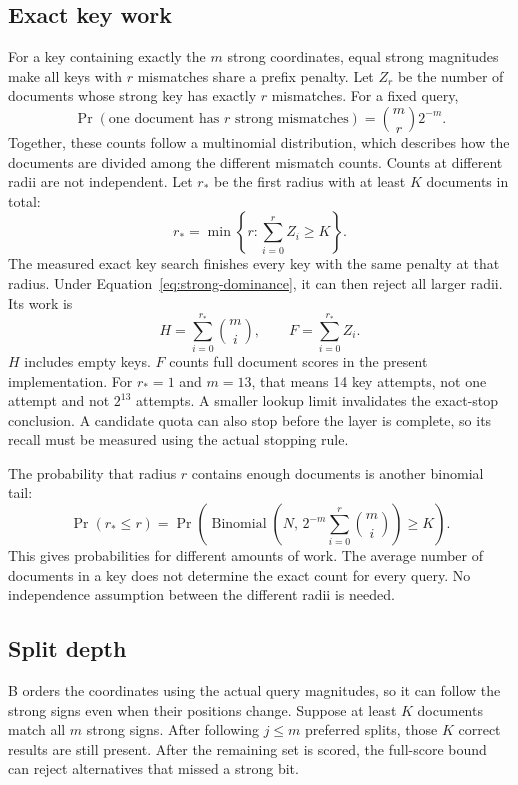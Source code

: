 \subsection{Exact key work}
For a key containing exactly the $m$ strong coordinates, equal strong magnitudes make all keys
with $r$ mismatches share a prefix penalty. Let $Z_r$ be the number of documents whose strong
key has exactly $r$ mismatches. For a fixed query,
\[
\Pr(\text{one document has }r\text{ strong mismatches})=\binom mr2^{-m}.
\]
Together, these counts follow a multinomial distribution, which describes how the documents
are divided among the different mismatch counts. Counts at different radii are not independent. Let $r_*$ be the first radius with at least $K$ documents in total:
\[
r_* = \min\left\{r:\sum_{i=0}^{r}Z_i\ge K\right\}.
\]
The measured exact key search finishes every key with the same penalty at that radius. Under
Equation~\eqref{eq:strong-dominance}, it can then reject all larger radii. Its work is
\begin{equation}
H=\sum_{i=0}^{r_*}\binom mi,\qquad F=\sum_{i=0}^{r_*}Z_i.
\label{eq:strong-key-work}
\end{equation}
$H$ includes empty keys. $F$ counts full document scores in the present implementation.
For $r_*=1$ and $m=13$, that means 14 key attempts, not one attempt and not $2^{13}$ attempts.
A smaller lookup limit invalidates the exact-stop conclusion. A candidate quota can also stop
before the layer is complete, so its recall must be measured using the actual stopping rule.

The probability that radius $r$ contains enough documents is another binomial tail:
\[
\Pr(r_*\le r)=\Pr\!\left(\operatorname{Binomial}\!\left(N,\,2^{-m}\sum_{i=0}^{r}\binom mi\right)\ge K\right).
\]
This gives probabilities for different amounts of work. The average number of documents
in a key does not determine the exact count for every query. No independence assumption between the different radii is needed.

\subsection{Split depth}
B orders the coordinates using the actual query magnitudes, so it can follow the strong signs
even when their positions change. Suppose at least $K$ documents match all $m$ strong signs.
After following $j\le m$ preferred splits, those $K$ correct results are still present. After the
remaining set is scored, the full-score bound can reject alternatives that missed a strong bit.

